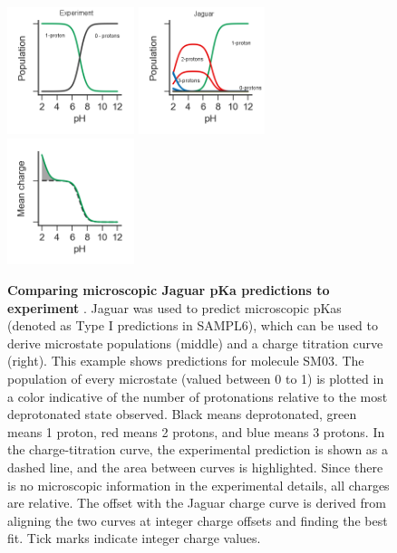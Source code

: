 \documentclass[9pt,lineno,final]{elife}
\begin{document}
\begin{figure}[H]
	\centering
	\includegraphics[width=0.33\textwidth]{Reports/Experiment-populations-SM03-titled.png}
	\includegraphics[width=0.33\textwidth]{Reports/Jaguar-TypeI-populations-SM03-titled.png}
	\includegraphics[width=0.33\textwidth]{Reports/Jaguar-TypeI-virtual-titration-SM03.png}
		\caption{{\bf Comparing microscopic Jaguar pKa predictions to experiment} . Jaguar was used to predict microscopic pKas (denoted as Type I predictions in SAMPL6), which can be used to derive microstate populations (middle) and a charge titration curve (right). This example shows predictions for molecule SM03. The population of every microstate (valued between 0 to 1) is plotted in a color indicative of the number of protonations relative to the most deprotonated state observed. Black means deprotonated, green means 1 proton, red means 2 protons, and blue means 3 protons. In the charge-titration curve, the experimental prediction is shown as a dashed line, and the area between curves is highlighted. Since there is no microscopic information in the experimental details, all charges are relative. The offset with the Jaguar charge curve is derived from aligning the two curves at integer charge offsets and finding the best fit. Tick marks indicate integer charge values.  
	\label{fig:jaguar-prediction}}
\end{figure}
\end{document}
